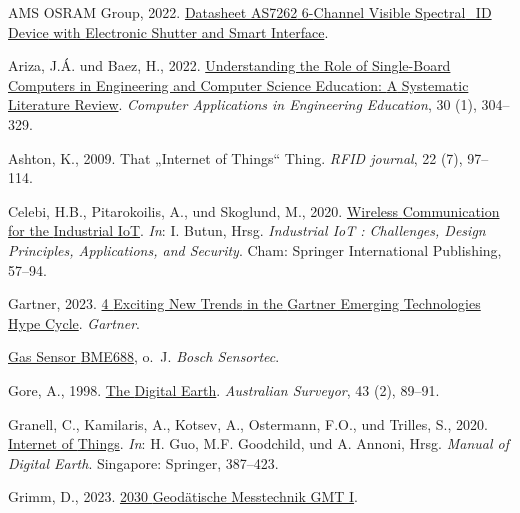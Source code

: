 \documentclass[
  11pt,
  a4paper,
  oneside, openany  ,captions=tableheading
]{scrbook}
\newlength{\cslhangindent}
\newenvironment{CSLReferences}[2] %
  {\begin{list}{}{%
   \setlength{\itemindent}{0pt}
   \setlength{\leftmargin}{0pt}
   \setlength{\parsep}{0pt}
   \ifodd #1
    \setlength{\leftmargin}{\cslhangindent}
    \setlength{\itemindent}{-1\cslhangindent}
   \fi
   \setlength{\itemsep}{#2\baselineskip}}}
  {\end{list}}
\theoremstyle{remark}
\begin{document}
\label{refs}
\begin{CSLReferences}{1}{0}
AMS OSRAM Group, 2022.
\href{https://ams.com/documents/20143/36005/AS7262/_DS000486/_5-00.pdf}{Datasheet
{AS7262} 6-{Channel Visible Spectral}\_{ID Device} with {Electronic
Shutter} and {Smart Interface}}.

Ariza, J.Á. und Baez, H., 2022.
\href{https://doi.org/10.1002/cae.22439}{Understanding the Role of
Single-Board Computers in Engineering and Computer Science Education:
{A} Systematic Literature Review}. \emph{Computer Applications in
Engineering Education}, 30 (1), 304--329.

Ashton, K., 2009. That {„Internet of Things``} Thing. \emph{RFID
journal}, 22 (7), 97--114.

Celebi, H.B., Pitarokoilis, A., und Skoglund, M., 2020.
\href{https://doi.org/10.1007/978-3-030-42500-5_2}{Wireless
{Communication} for the {Industrial IoT}}. \emph{In}: I. Butun, Hrsg.
\emph{Industrial {IoT} : {Challenges}, {Design Principles},
{Applications}, and {Security}}. {Cham}: {Springer International
Publishing}, 57--94.

Gartner, 2023.
\href{https://www.gartner.com/en/articles/what-s-new-in-the-2023-gartner-hype-cycle-for-emerging-technologies}{4
{Exciting New Trends} in the {Gartner Emerging Technologies Hype
Cycle}}. \emph{Gartner}.

\href{https://www.bosch-sensortec.com/products/environmental-sensors/gas-sensors/bme688/}{Gas
Sensor {BME688}}, o.~J. \emph{Bosch Sensortec}.

Gore, A., 1998.
\href{https://doi.org/10.1080/00050348.1998.10558728}{The {Digital
Earth}}. \emph{Australian Surveyor}, 43 (2), 89--91.

Granell, C., Kamilaris, A., Kotsev, A., Ostermann, F.O., und Trilles,
S., 2020. \href{https://doi.org/10.1007/978-981-32-9915-3_11}{Internet
of {Things}}. \emph{In}: H. Guo, M.F. Goodchild, und A. Annoni, Hrsg.
\emph{Manual of {Digital Earth}}. {Singapore}: {Springer}, 387--423.

Grimm, D., 2023.
\href{https://moodle.fhnw.ch/course/view.php?id=37277}{2030
{Geod{ä}tische Messtechnik GMT I}}.


\end{CSLReferences}
\end{document}
